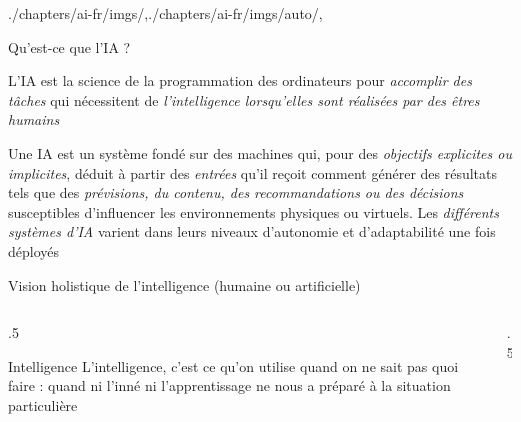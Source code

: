 \begin{graphicspathcontext}{{./chapters/ai-fr/imgs/},{./chapters/ai-fr/imgs/auto/},\old}

\begin{frame}[c]{Qu'est-ce que l'IA ?}
	\begin{definition}
		L'IA est la science de la programmation des ordinateurs pour \emph{accomplir des tâches} qui nécessitent de \emph{l'intelligence lorsqu'elles sont réalisées par des êtres humains}
	\end{definition}
	\vspace{1cm}
	\begin{definition}[de l'OCDE]
		Une IA est un système fondé sur des machines qui, pour des \emph{objectifs explicites ou implicites}, déduit à partir des \emph{entrées} qu'il reçoit comment générer des résultats tels que des \emph{prévisions, du contenu, des recommandations ou des décisions} susceptibles d'influencer les environnements physiques ou virtuels. Les \emph{différents systèmes d'IA} varient dans leurs niveaux d'autonomie et d'adaptabilité une fois déployés
	\end{definition}
\end{frame}


\begin{frame}[c]{Vision holistique de l'intelligence (humaine ou artificielle)}
	\begin{columns}
		\begin{column}{.5\linewidth}
			\begin{definitionblock}{Intelligence \cite{piaget1947psychologie}}
				L'intelligence, c'est ce qu'on utilise quand on ne sait pas quoi faire : quand ni l'inné ni l'apprentissage ne nous a préparé à la situation particulière
			\end{definitionblock}
		\end{column}
		\begin{column}{.5\linewidth}
			\hfill
			 \\[.5cm]
			\hfill
		\end{column}
	\end{columns}
\end{frame}



\end{graphicspathcontext}

\endinput

